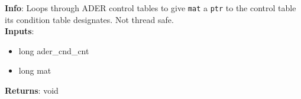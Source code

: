 \textbf{Info}: Loops through ADER control tables to give \texttt{mat} a
\texttt{ptr} to the control table its condition table designates. Not thread
safe.\\

\noindent \textbf{Inputs}:
\begin{itemize}
\item{long ader\_cnd\_cnt}
\item{long mat}
\end{itemize}

\noindent \textbf{Returns}: void

